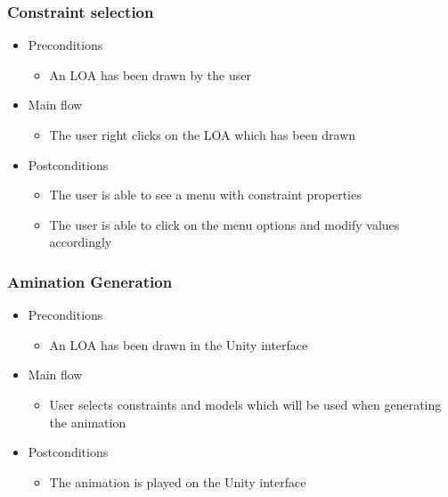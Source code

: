 \subsubsection{Constraint selection}
    \begin{itemize}
    \item Preconditions
        \begin{itemize}
            \item An LOA has been drawn by the user
        \end{itemize}
    \end{itemize}
    \begin{itemize}
        \item Main flow
        \begin{itemize}
            \item The user right clicks on the LOA which has been drawn
        \end{itemize}
    \end{itemize}
    \begin{itemize}
        \item Postconditions
        \begin{itemize}
            \item The user is able to see a menu with constraint properties
            \item The user is able to click on the menu options and modify values accordingly
        \end{itemize}
    \end{itemize}

\subsubsection{Amination Generation}
    \begin{itemize}
    \item Preconditions
        \begin{itemize}
            \item An LOA has been drawn in the Unity interface
        \end{itemize}
    \end{itemize}
    \begin{itemize}
        \item Main flow
        \begin{itemize}
            \item User selects constraints and models which will be used when generating the animation
        \end{itemize}
    \end{itemize}
    \begin{itemize}
        \item Postconditions
        \begin{itemize}
            \item The animation is played on the Unity interface
        \end{itemize}
    \end{itemize}


